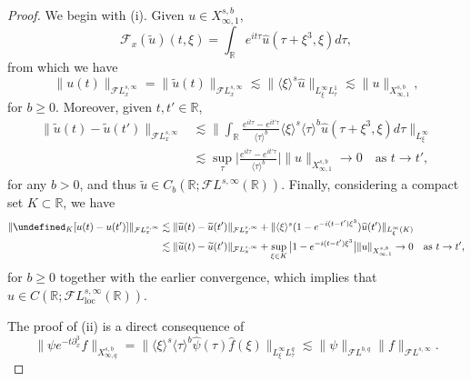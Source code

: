 \documentclass[a4paper,
11pt,  reqno]{amsart}
\newcommand{\jap}[1]{\langle #1 \rangle}
\newcommand{\5}{\textup{V}}
\newcommand{\FL}{\mathcal{F} L}
\newcommand{\ft}{\widehat}
\newcommand{\les}{\lesssim}
\newcommand{\wt}{\widetilde}
\theoremstyle{remark}
\newcommand{\R}{\mathbb{R}}
\let\P= \undefined
\newcommand{\P}{\mathbf{P}}
\newcommand{\Ft}{{\mathcal{F}}}
\newcommand{\jb}[1]
{\langle #1 \rangle}
\numberwithin{equation}{section}
\numberwithin{theorem}{section}
\begin{document}
		\begin{proof}
			
			We begin with (i). Given $u\in X^{s,b}_{\infty,1}$,
			$$
            \Ft_x(\wt u)(t,\xi) = \int_\R e^{it\tau}\ft{u}(\tau+\xi^3,\xi)d\tau, 
			$$ 
            from which we have
$$\| u(t)\|_{\FL^{s,\infty}_x} = \|\wt{u}(t)\|_{\FL^{s,\infty}_x} \lesssim \|\jap{\xi}^s\ft {u}\|_{L^\infty_\xi L^1_\tau} \les \|u\|_{X^{s,b}_{\infty,1}}, 
			$$
            for $b\ge 0$. 
			Moreover, given $t,t'\in\R$,
			\begin{align*}
				\|\wt{u}(t)-\wt{u}(t')\|_{\FL_x^{s,\infty}} &\lesssim \bigg\|\int_\R \frac{e^{it\tau}-e^{it'\tau}}{\jap{\tau}^b}\jap{\xi}^s\jap{\tau}^b\ft{u}(\tau+\xi^3,\xi)d\tau\bigg\|_{L^\infty_\xi}\\&\lesssim \sup_{\tau} \bigg| \frac{e^{it\tau}-e^{it'\tau}}{\jap{\tau}^b}\bigg| \|u\|_{X^{s,b}_{\infty,1}} \to 0 \quad \mbox{as }t\to t',
			\end{align*}
            for any $b>0$, 
			and thus $\wt{u}\in C_b(\R;\FL^{s,\infty}(\R))$. Finally, considering a compact set $K\subset \R$, we have
			\begin{align*}
				\| \P_K [u(t)-u(t')]\|_{\mathcal{F}L^{s,\infty}_x} 
                &
                \lesssim \|\wt{u}(t)-\wt{u}(t')\|_{\FL^{s,\infty}_x} 
                + \|\jb{\xi}^s (1-e^{-i(t-t')\xi^3})\ft{u}(t')\|_{L^\infty_\xi (K) } \\
                &\lesssim \|\wt{u}(t)-\wt{u}(t')\|_{\FL^{s,\infty}_x} + \sup_{\xi\in K}\big|1 -e^{-i (t-t')\xi^3}\big| \| u \|_{X^{s,b}_{\infty,1}} \to 0\quad \mbox{as }t\to t', 
			\end{align*}
            for $b\ge0$ together
            with the earlier convergence,
			which implies that $u\in C(\R;\mathcal{F}L^{s,\infty}_{\mathrm{loc}}(\R))$. 


            The proof of (ii) is a direct consequence of
			$$
			\|\psi e^{-t\partial_x^3}f\|_{X^{s,b}_{\infty,q}} = \|\jap{\xi}^s\jap{\tau}^b\ft{\psi}(\tau)\ft{f}(\xi)\|_{L^\infty_\xi L^q_\tau} \lesssim \|\psi\|_{\FL^{b,q}} \|f\|_{\FL^{s,\infty}}.
			$$

            
            
            
			\smallskip
			

\end{proof}
\end{document}
